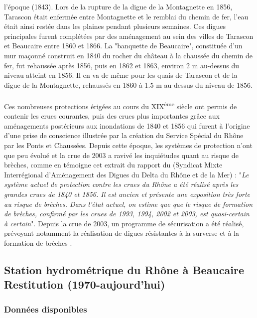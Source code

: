 \documentclass[11pt]{article}
\begin{document}
l'époque (1843). Lors de la rupture de la digue de la Montagnette en 1856, Tarascon était enfermée entre Montagnette et le remblai du chemin de fer, l'eau était ainsi restée dans les plaines pendant plusieurs semaines. Ces digues principales furent complétées par des aménagement au sein des villes de Tarascon et Beaucaire entre 1860 et 1866. La "banquette de Beaucaire", constituée d'un mur maçonné construit en 1840 du rocher du château à la chaussée du chemin de fer, fut rehaussée après 1856, puis en 1862 et 1863, environ 2 m au-dessus du niveau atteint en 1856. Il en va de même pour les quais de Tarascon et de la digue de la Montagnette, rehaussés en 1860 à 1.5 m au-dessus du niveau de 1856.
		
		\paragraph{} Ces nombreuses protections érigées au cours du XIX\textsuperscript{ème} siècle ont permis de contenir les crues courantes, puis des crues plus importantes grâce aux aménagements postérieurs aux inondations de 1840 et 1856 qui furent à l'origine d'une prise de conscience illustrée par la création du Service Spécial du Rhône par les Ponts et Chaussées. Depuis cette époque, les systèmes de protection n'ont que peu évolué et la crue de 2003 a ravivé les inquiétudes quant au risque de brèches, comme en témoigne cet extrait du rapport du \citet{symadrem_programme_2012} (Syndicat Mixte Interrégional d'Aménagement des Digues du Delta du Rhône et de la Mer) : "\textit{Le système actuel de protection contre les crues du Rhône a été réalisé après les grandes crues de 1840 et 1856. Il est ancien et présente une exposition très forte au risque de brèches. Dans l'état actuel, on estime que que le risque de formation de brèches, confirmé par les crues de 1993, 1994, 2002 et 2003, est quasi-certain à certain}". Depuis la crue de 2003, un programme de sécurisation a été réalisé, prévoyant notamment la réalisation de digues résistantes à la surverse et à la formation de brèches \citep{symadrem_programme_2012}.    
		
	
\FloatBarrier
	\subsection{Station hydrométrique du Rhône à Beaucaire Restitution (1970-aujourd'hui)}
	
	\subsubsection{Données disponibles}
\end{document}
